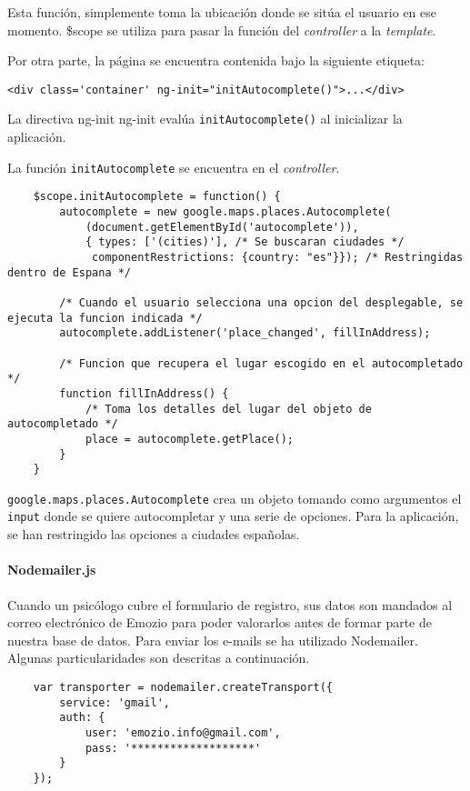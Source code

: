 Esta función, simplemente toma la ubicación donde se sitúa el usuario en ese momento. \$scope se utiliza para pasar la función del \textit{controller} a la \textit{template}.


Por otra parte, la página se encuentra contenida bajo la siguiente etiqueta:


\medskip
\begin{lstlisting}
<div class='container' ng-init="initAutocomplete()">...</div>
\end{lstlisting}


La directiva ng-init ng-init evalúa \texttt{initAutocomplete()} al inicializar la aplicación.


La función \texttt{initAutocomplete} se encuentra en el \textit{controller}.


\medskip
\begin{lstlisting}
	$scope.initAutocomplete = function() {
		autocomplete = new google.maps.places.Autocomplete(
			(document.getElementById('autocomplete')),
			{ types: ['(cities)'], /* Se buscaran ciudades */
			 componentRestrictions: {country: "es"}}); /* Restringidas dentro de Espana */

		/* Cuando el usuario selecciona una opcion del desplegable, se ejecuta la funcion indicada */
		autocomplete.addListener('place_changed', fillInAddress);

		/* Funcion que recupera el lugar escogido en el autocompletado */
		function fillInAddress() {
			/* Toma los detalles del lugar del objeto de autocompletado */
			place = autocomplete.getPlace();
		}
	}
\end{lstlisting}


\texttt{google.maps.places.Autocomplete} crea un objeto tomando como argumentos el \texttt{input} donde se quiere autocompletar y una serie de opciones. Para la aplicación, se han restringido las opciones a ciudades españolas.


\paragraph*{Nodemailer.js}


Cuando un psicólogo cubre el formulario de registro, sus datos son mandados al correo electrónico de Emozio para poder valorarlos antes de formar parte de nuestra base de datos. Para enviar los e-mails se ha utilizado Nodemailer. Algunas particularidades son descritas a continuación.


\medskip
\begin{lstlisting}
	var transporter = nodemailer.createTransport({ 
		service: 'gmail', 
		auth: { 
			user: 'emozio.info@gmail.com', 
			pass: '*******************' 
		} 
	});
\end{lstlisting}


